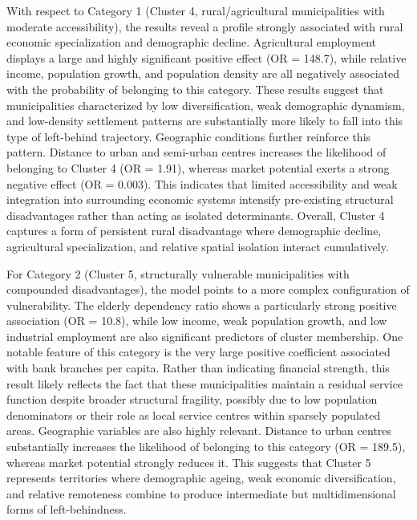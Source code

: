 \documentclass[a4paper,11pt,oneside]{article}
\begin{document}
With respect to Category 1 (Cluster 4, rural/agricultural municipalities with moderate accessibility), the results reveal a profile strongly associated with rural economic specialization and demographic decline. Agricultural employment displays a large and highly significant positive effect (OR = 148.7), while relative income, population growth, and population density are all negatively associated with the probability of belonging to this category. These results suggest that municipalities characterized by low diversification, weak demographic dynamism, and low-density settlement patterns are substantially more likely to fall into this type of left-behind trajectory. Geographic conditions further reinforce this pattern. Distance to urban and semi-urban centres increases the likelihood of belonging to Cluster 4 (OR = 1.91), whereas market potential exerts a strong negative effect (OR = 0.003). This indicates that limited accessibility and weak integration into surrounding economic systems intensify pre-existing structural disadvantages rather than acting as isolated determinants. Overall, Cluster 4 captures a form of persistent rural disadvantage where demographic decline, agricultural specialization, and relative spatial isolation interact cumulatively.

For Category 2 (Cluster 5, structurally vulnerable municipalities with compounded disadvantages), the model points to a more complex configuration of vulnerability. The elderly dependency ratio shows a particularly strong positive association (OR = 10.8), while low income, weak population growth, and low industrial employment are also significant predictors of cluster membership. One notable feature of this category is the very large positive coefficient associated with bank branches per capita. Rather than indicating financial strength, this result likely reflects the fact that these municipalities maintain a residual service function despite broader structural fragility, possibly due to low population denominators or their role as local service centres within sparsely populated areas. Geographic variables are also highly relevant. Distance to urban centres substantially increases the likelihood of belonging to this category (OR = 189.5), whereas market potential strongly reduces it. This suggests that Cluster 5 represents territories where demographic ageing, weak economic diversification, and relative remoteness combine to produce intermediate but multidimensional forms of left-behindness.
\end{document}
